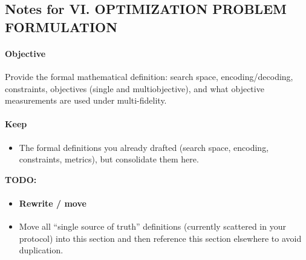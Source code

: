 \subsection*{Notes for VI. OPTIMIZATION PROBLEM FORMULATION}
\paragraph{Objective}
Provide the formal mathematical definition: search space, encoding/decoding, constraints, objectives (single and multiobjective), and what objective measurements are used under multi-fidelity.

\paragraph{Keep}
\begin{itemize}
  \item The formal definitions you already drafted (search space, encoding, constraints, metrics), but consolidate them here.
\end{itemize}

\textbf{TODO:}
\begin{itemize}
    \item \paragraph{Rewrite / move}
\end{itemize}
\begin{itemize}
  \begin{itemize}
      \item Move all “single source of truth” definitions (currently scattered in your protocol) into this section and then reference this section elsewhere to avoid duplication.
  \end{itemize}
\end{itemize}

